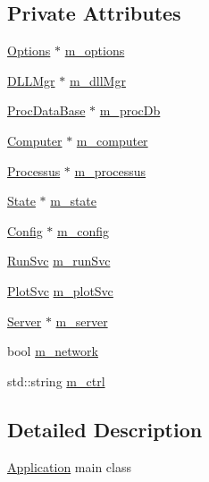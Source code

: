 \subsection*{Private Attributes}
\begin{DoxyCompactItemize}
\item 
\hyperlink{classOptions}{Options} $\ast$ \hyperlink{classApplication_a3b0c74bf1ba99a5042990e3fefaa8963}{m\+\_\+options}
\item 
\hyperlink{classDLLMgr}{D\+L\+L\+Mgr} $\ast$ \hyperlink{classApplication_a66b06cbeb824fe00ecd11499fcf01c55}{m\+\_\+dll\+Mgr}
\item 
\hyperlink{classProcDataBase}{Proc\+Data\+Base} $\ast$ \hyperlink{classApplication_af030cefeb69586f01e965606d5dd8919}{m\+\_\+proc\+Db}
\item 
\hyperlink{classComputer}{Computer} $\ast$ \hyperlink{classApplication_a17c9fd27b6abbc18abb6d5de5d7648ef}{m\+\_\+computer}
\item 
\hyperlink{classProcessus}{Processus} $\ast$ \hyperlink{classApplication_ab5eb4b3d3bef5ab9fce9c69401ce5786}{m\+\_\+processus}
\item 
\hyperlink{classState}{State} $\ast$ \hyperlink{classApplication_a0ef9832e2d286716e597a1ff21ffcab4}{m\+\_\+state}
\item 
\hyperlink{classConfig}{Config} $\ast$ \hyperlink{classApplication_ae05f3e253ea871a194c3d30fd1d3b0c3}{m\+\_\+config}
\item 
\hyperlink{Application_8h_a59643f52f9391fa83f137814aaae27ef}{Run\+Svc} \hyperlink{classApplication_ad2c061af424280151c86b9b56d9724d3}{m\+\_\+run\+Svc}
\item 
\hyperlink{Application_8h_abaa10d33ca2837dfcf8ba9bff40cdbb6}{Plot\+Svc} \hyperlink{classApplication_a30d5600ea5e4f36b14f25f903ee3256e}{m\+\_\+plot\+Svc}
\item 
\hyperlink{classServer}{Server} $\ast$ \hyperlink{classApplication_a5e6085b0f322d5036177b16113a75b56}{m\+\_\+server}
\item 
bool \hyperlink{classApplication_a7dc2bb72356cd9186eaad49eb506995a}{m\+\_\+network}
\item 
std\+::string \hyperlink{classApplication_aa371ed989ed34038df400c4d1b41b37f}{m\+\_\+ctrl}
\end{DoxyCompactItemize}


\subsection{Detailed Description}
\hyperlink{classApplication}{Application} main class

